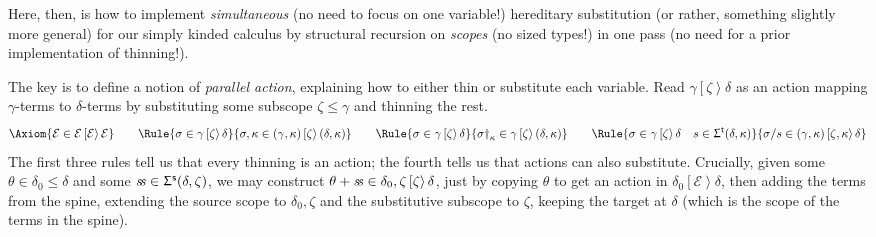 \documentclass[natbib]{article}
\newcommand{\EC}{\mathcal{E}}
\begin{document}
Here, then, is how to implement \emph{simultaneous} (no need to focus on one variable!) hereditary substitution (or rather, something slightly more general) for our simply kinded calculus by structural recursion on \emph{scopes} (no sized types!) in one pass (no need for a prior implementation of thinning!).
\newcommand{\act}[3]{#1 \left[#2\right> #3}

The key is to define a notion of \emph{parallel action}, explaining how to either thin or substitute each variable. Read $\act\gamma\zeta\delta$ as an action mapping $\gamma$-terms to $\delta$-terms by substituting some subscope $\zeta\le\gamma$ and thinning the rest.
\[
\Axiom{\EC \in \act\EC\EC\EC}
\qquad
\Rule{\sigma \in \act\gamma\zeta\delta}
     {\sigma,\kappa \in \act{(\gamma,\kappa)}\zeta{(\delta,\kappa)}}
\qquad
\Rule{\sigma \in \act\gamma\zeta\delta}
     {\sigma\dag_\kappa \in \act\gamma\zeta{(\delta,\kappa)}}
\qquad
\Rule{\sigma \in \act\gamma\zeta\delta\quad s\in\Sgt\delta\kappa}
     {\sigma/s \in \act{(\gamma,\kappa)}{\zeta,\kappa}\delta}
\]
The first three rules tell us that every thinning is an action; the fourth tells us that actions can also substitute.
Crucially, given some $\theta\in\delta_0\le\delta$ and some $\mathit{s\!s}\in\Upsigma^{\mathsf{s}}(\delta,\zeta)$, we may construct
$\theta+\sss\in\act{\delta_0,\zeta}\zeta\delta$, just by copying $\theta$ to get an action in $\act{\delta_0}\EC\delta$,
then adding the terms from the spine, extending the source scope to $\delta_0,\zeta$ and the substitutive subscope to $\zeta$,
keeping the target at $\delta$ (which is the scope of the terms in the spine).
\end{document}
